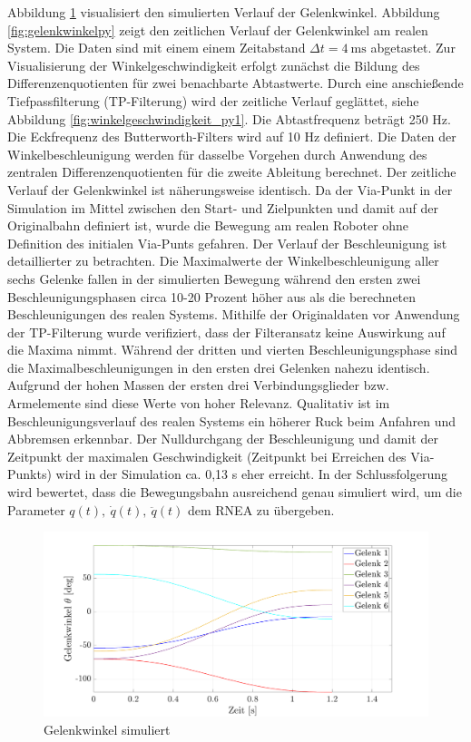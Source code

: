 Abbildung \ref{fig:gelenkwinkel}  visualisiert den simulierten  Verlauf der Gelenkwinkel. Abbildung \ref{fig:gelenkwinkelpy} zeigt den zeitlichen Verlauf der Gelenkwinkel am realen System. Die Daten sind mit einem einem  Zeitabstand $\Delta t = 4~\text{ms}$ abgetastet. Zur Visualisierung der Winkelgeschwindigkeit  erfolgt zunächst die Bildung des Differenzenquotienten für zwei benachbarte Abtastwerte. Durch eine anschießende Tiefpassfilterung (TP-Filterung) wird der zeitliche Verlauf geglättet, siehe Abbildung \ref{fig:winkelgeschwindigkeit_py1}. Die Abtastfrequenz beträgt 250 Hz. Die Eckfrequenz des Butterworth-Filters wird auf 10 Hz definiert. Die Daten der Winkelbeschleunigung werden für dasselbe Vorgehen durch Anwendung des zentralen Differenzenquotienten für die zweite Ableitung berechnet. Der zeitliche Verlauf der Gelenkwinkel ist näherungsweise identisch. Da der Via-Punkt in der Simulation im Mittel zwischen den Start- und Zielpunkten und damit auf der Originalbahn definiert ist, wurde die Bewegung am realen Roboter ohne Definition des initialen Via-Punts gefahren. Der Verlauf der Beschleunigung ist detaillierter zu betrachten. Die Maximalwerte der Winkelbeschleunigung aller sechs Gelenke fallen in der simulierten Bewegung während den ersten zwei Beschleunigungsphasen circa 10-20 Prozent höher aus als die berechneten Beschleunigungen des realen Systems. Mithilfe der Originaldaten vor Anwendung der TP-Filterung wurde verifiziert, dass der Filteransatz keine Auswirkung auf die Maxima nimmt. Während der dritten und vierten Beschleunigungsphase sind die Maximalbeschleunigungen in den ersten drei Gelenken nahezu identisch. Aufgrund der hohen  Massen der ersten drei Verbindungsglieder bzw. Armelemente sind diese Werte von hoher Relevanz. Qualitativ ist im Beschleunigungsverlauf des realen Systems ein höherer Ruck beim Anfahren und Abbremsen erkennbar. Der Nulldurchgang der Beschleunigung und damit der Zeitpunkt der maximalen Geschwindigkeit (Zeitpunkt bei Erreichen des Via-Punkts) wird in der Simulation ca. 0,13 s eher erreicht. In der Schlussfolgerung wird bewertet, dass die Bewegungsbahn ausreichend genau simuliert wird, um die Parameter  $q(t), ~\dot{q}(t), ~\ddot{q}(t)$ dem RNEA zu übergeben. 
%
\newpage
\begin{figure}[]
	\centering
	\includegraphics[width=1\linewidth]{images/posmat}
	\caption{Gelenkwinkel simuliert}
	\label{fig:gelenkwinkel}
\end{figure}
